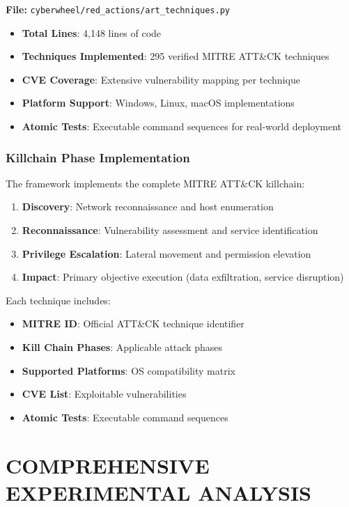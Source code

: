 \documentclass[11pt]{article}
\begin{document}
\textbf{File:} \texttt{cyberwheel/red\_actions/art\_techniques.py}
\begin{itemize}
\item \textbf{Total Lines}: 4,148 lines of code
\item \textbf{Techniques Implemented}: 295 verified MITRE ATT\&CK techniques
\item \textbf{CVE Coverage}: Extensive vulnerability mapping per technique
\item \textbf{Platform Support}: Windows, Linux, macOS implementations
\item \textbf{Atomic Tests}: Executable command sequences for real-world deployment
\end{itemize}

\subsubsection{Killchain Phase Implementation}

The framework implements the complete MITRE ATT\&CK killchain:

\begin{enumerate}
\item \textbf{Discovery}: Network reconnaissance and host enumeration
\item \textbf{Reconnaissance}: Vulnerability assessment and service identification
\item \textbf{Privilege Escalation}: Lateral movement and permission elevation
\item \textbf{Impact}: Primary objective execution (data exfiltration, service disruption)
\end{enumerate}

Each technique includes:
\begin{itemize}
\item \textbf{MITRE ID}: Official ATT\&CK technique identifier
\item \textbf{Kill Chain Phases}: Applicable attack phases
\item \textbf{Supported Platforms}: OS compatibility matrix
\item \textbf{CVE List}: Exploitable vulnerabilities
\item \textbf{Atomic Tests}: Executable command sequences
\end{itemize}

\section{COMPREHENSIVE EXPERIMENTAL ANALYSIS}
\end{document}
